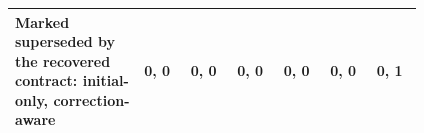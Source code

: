 \begin{table}[t]
\begin{tabular}{p{0.25\linewidth}p{0.093\linewidth}p{0.093\linewidth}p{0.093\linewidth}p{0.093\linewidth}p{0.093\linewidth}p{0.093\linewidth}}
\raggedright\hspace{0pt}Marked superseded by the recovered contract: initial-only, correction-aware & \raggedright\hspace{0pt}0, 0 & \raggedright\hspace{0pt}0, 0 & \raggedright\hspace{0pt}0, 0 & \raggedright\hspace{0pt}0, 0 & \raggedright\hspace{0pt}0, 0 & \raggedright\hspace{0pt}0, 1 \tabularnewline
\bottomrule\end{tabular}\end{table}

